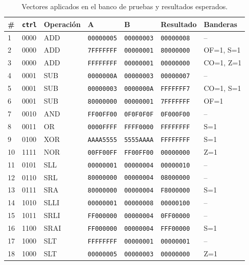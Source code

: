 \documentclass[12pt,letterpaper]{article}
\begin{document}
\begin{table}[H]
\centering
\caption{Vectores aplicados en el banco de pruebas y resultados esperados.}
\label{tab:vectores}
\small
\begin{tabular}{C{0.7cm}C{1.3cm}C{1.6cm}C{2cm}C{2cm}C{2cm}C{2.6cm}}
\toprule
\# & \texttt{ctrl} & Operación & A & B & Resultado & Banderas\\
  & 0000 & ADD   & \texttt{00000005} & \texttt{00000003} & \texttt{00000008} & --\\
2  & 0000 & ADD   & \texttt{7FFFFFFF} & \texttt{00000001} & \texttt{80000000} & OF=1, S=1\\
3  & 0000 & ADD   & \texttt{FFFFFFFF} & \texttt{00000001} & \texttt{00000000} & CO=1, Z=1\\
4  & 0001 & SUB   & \texttt{0000000A} & \texttt{00000003} & \texttt{00000007} & --\\
5  & 0001 & SUB   & \texttt{00000003} & \texttt{0000000A} & \texttt{FFFFFFF7} & CO=1, S=1\\
6  & 0001 & SUB   & \texttt{80000000} & \texttt{00000001} & \texttt{7FFFFFFF} & OF=1\\
7  & 0010 & AND   & \texttt{FF00FF00} & \texttt{0F0F0F0F} & \texttt{0F000F00} & --\\
8  & 0011 & OR    & \texttt{0000FFFF} & \texttt{FFFF0000} & \texttt{FFFFFFFF} & S=1\\
9  & 0100 & XOR   & \texttt{AAAA5555} & \texttt{5555AAAA} & \texttt{FFFFFFFF} & S=1\\
10 & 1111 & NOR   & \texttt{00FF00FF} & \texttt{FF00FF00} & \texttt{00000000} & Z=1\\
11 & 0101 & SLL   & \texttt{00000001} & \texttt{00000004} & \texttt{00000010} & --\\
12 & 0110 & SRL   & \texttt{80000000} & \texttt{00000004} & \texttt{08000000} & --\\
13 & 0111 & SRA   & \texttt{80000000} & \texttt{00000004} & \texttt{F8000000} & S=1\\
14 & 1010 & SLLI  & \texttt{00000001} & \texttt{00000008} & \texttt{00000100} & --\\
15 & 1011 & SRLI  & \texttt{FF000000} & \texttt{00000004} & \texttt{0FF00000} & --\\
16 & 1100 & SRAI  & \texttt{FF000000} & \texttt{00000004} & \texttt{FFF00000} & S=1\\
17 & 1000 & SLT   & \texttt{FFFFFFFF} & \texttt{00000001} & \texttt{00000001} & --\\
18 & 1000 & SLT   & \texttt{00000005} & \texttt{00000003} & \texttt{00000000} & Z=1\\

\end{tabular}
\end{table}
\end{document}
